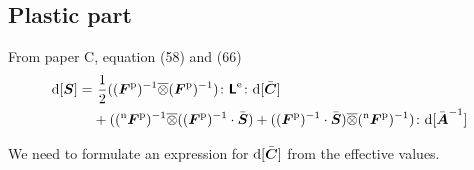 \documentclass[a4paper,11pt]{article}
\newcommand{\ootimes}{\overline{\otimes}}
\newcommand{\tf}[1]{\text{\boldmath $\sf #1$}}
\newcommand{\ts}[1]{\text{\boldmath $#1$}}
\newcommand{\vol}{{\rm vol}}
\newcommand{\trial}{{\rm trial}}
\newcommand{\rmd}{{\rm d}}
\newcommand{\rme}{{\rm e}}
\newcommand{\rmp}{{\rm p}}
\newcommand{\rmT}{{\rm T}}
\newcommand{\old}{{}^{\rm n}}
\begin{document}
\subsection{Plastic part}
From paper C, equation (58) and (66)
\begin{align*}
	\rmd[\ts S] =&\ \frac12((\ts F^\rmp)^{-1}\ootimes(\ts F^\rmp)^{-1})\colon \tf L^\rme \colon \rmd[\bar{\ts C}] \\
	&+ ((\old\ts F^\rmp)^{-1}\ootimes((\ts F^\rmp)^{-1}\cdot \bar{\ts S})+((\ts F^\rmp)^{-1}\cdot \bar{\ts S})\ootimes (\old \ts F^\rmp)^{-1})\colon\rmd[\bar{\ts A}^{-1}]
\end{align*}

We need to formulate an expression for $\rmd[\bar{\ts C}]$ from the effective values.

\end{document}
